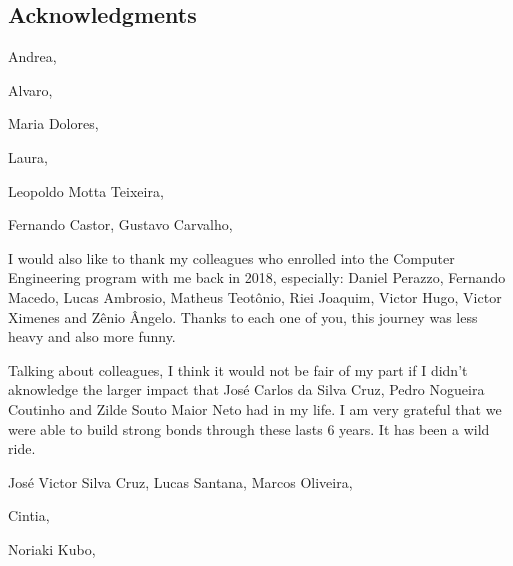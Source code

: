 \thispagestyle{empty}
\begin{spacing}{1.0}
\chapter*{Acknowledgments}

Andrea,

Alvaro,

Maria Dolores,

Laura,

Leopoldo Motta Teixeira,

Fernando Castor, Gustavo Carvalho,

I would also like to thank my colleagues who enrolled into the Computer Engineering program with me back in 2018, especially: Daniel Perazzo, Fernando Macedo, Lucas Ambrosio, Matheus Teotônio, Riei Joaquim, Victor Hugo, Victor Ximenes and Zênio Ângelo. Thanks to each one of you, this journey was less heavy and also more funny.

Talking about colleagues, I think it would not be fair of my part if I didn't aknowledge the larger impact that José Carlos da Silva Cruz, Pedro Nogueira Coutinho and Zilde Souto Maior Neto had in my life. I am very grateful that we were able to build strong bonds through these lasts 6 years. It has been a wild ride.

José Victor Silva Cruz, Lucas Santana, Marcos Oliveira,

Cintia,

Noriaki Kubo,
    
\clearpage
\end{spacing}